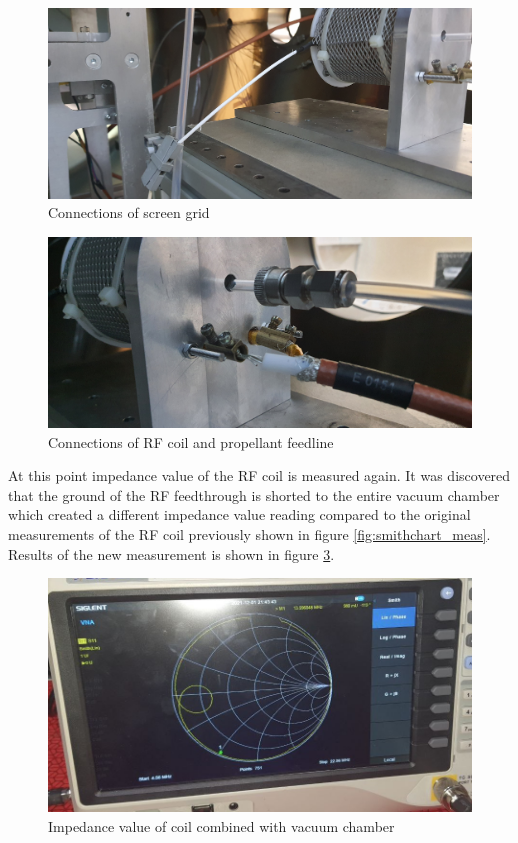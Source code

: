 \begin{figure}[h]
    \centering
    \includegraphics[scale=0.12]{fig/invacuum_screen.jpg}
    \caption{Connections of screen grid}
    \label{fig:invacuum_screen}
\end{figure}
\newpage
\begin{figure}[h]
    \centering
    \includegraphics[scale=0.1]{fig/invacuum_rf.jpg}
    \caption{Connections of RF coil and propellant feedline}
    \label{fig:invacuum_rf}
\end{figure}

At this point impedance value of the RF coil is measured again.  It was discovered that the ground of the RF feedthrough is shorted to the entire vacuum chamber which created a different impedance value reading compared to the original measurements of the RF coil previously shown in figure \ref{fig:smithchart_meas}. Results of the new measurement is shown in figure \ref{fig:smithchar_meas_comb}.

\begin{figure}[h]
    \centering
    \includegraphics[scale=0.5]{fig/antenna_meas_combined.jpeg}
    \caption{Impedance value of coil combined with vacuum chamber}
    \label{fig:smithchar_meas_comb}
\end{figure}

